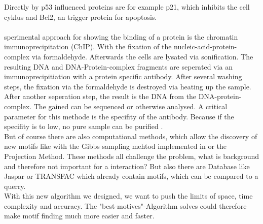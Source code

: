 \documentclass[%
   10pt,              %
   nenglish,           %
   a4paper,           %
   DIV11,             %
]{scrartcl}%
\begin{document}
Directly by p53 influenced proteins are for example p21, which inhibits the cell cyklus and Bcl2, an trigger protein for apoptosis.\cite{p53-Function}\\
\\sperimental approach for showing the binding of a protein is the chromatin immunoprecipitation (ChIP). With the fixation of the nucleic-acid-protein-complex via formaldehyde. Afterwards the cells are lysated via sonification. The resulting DNA and DNA-Protein-complex fragments are seperated via an immunoprecipitiation with a protein specific antibody. After several washing steps, the fixation via the formaldehyde is destroyed via heating up the sample. After another seperation step, the result is the DNA from the DNA-protein-complex. The gained can be sequenced or otherwise analysed. A critical parameter for this methode is the specifity of the antibody. Because if the specifity is to low, no pure sample can be purified \cite{chip}. \\
But of course there are also computational methods, which allow the discovery of new motifs like with the Gibbs sampling mehtod implemented in or the Projection Method. These methods all challenge the problem, what is background and therefore not important for a interaction? But also there are Database like Jaspar or TRANSFAC which already contain motifs, which can be compared to a querry. \\
With this new algorithm we designed, we want to push the limits of space, time complexity and accuracy. The "best-motives"-Algorithm solves could therefore make motif finding much more easier and faster.
\\
\newpage


 
\end{document}
